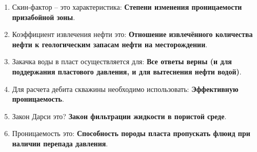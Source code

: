 \documentclass[main.tex]{subfiles}
\begin{document}
\begin{enumerate}
	\item Скин-фактор -- это характеристика: \textbf{Степени изменения проницаемости призабойной зоны}.
	\item Коэффициент извлечения нефти это: \textbf{Отношение извлечённого количества нефти к геологическим запасам нефти на месторождении}.
	\item Закачка воды в пласт осуществляется для: \textbf{Все ответы верны (и для поддержания пластового давления, и для вытеснения нефти водой)}.
	\item Для расчета дебита скважины необходимо использовать: \textbf{Эффективную проницаемость}.
	\item Закон Дарси это? \textbf{Закон фильтрации жидкости в пористой среде}.
	\item Проницаемость это: \textbf{Способность породы пласта пропускать флюид при наличии перепада давления}.
\end{enumerate}
	
\end{document}
